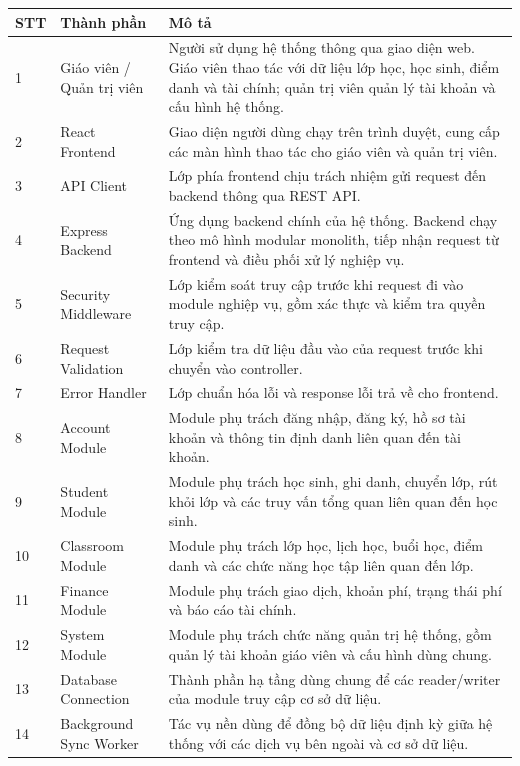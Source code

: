 \documentclass[12pt,a4paper]{article}
\begin{document}
\begingroup
\singlespacing
\setlength{\parskip}{0pt}
\renewcommand{\arraystretch}{1.25}
\footnotesize
\begin{longtable}{|p{1.2cm}|p{4.2cm}|p{9.0cm}|}
\hline
\textbf{STT} & \textbf{Thành phần} & \textbf{Mô tả} \\
\hline
\endhead
1 & Giáo viên / Quản trị viên & Người sử dụng hệ thống thông qua giao diện web. Giáo viên thao tác với dữ liệu lớp học, học sinh, điểm danh và tài chính; quản trị viên quản lý tài khoản và cấu hình hệ thống. \\
\hline
2 & React Frontend & Giao diện người dùng chạy trên trình duyệt, cung cấp các màn hình thao tác cho giáo viên và quản trị viên. \\
\hline
3 & API Client & Lớp phía frontend chịu trách nhiệm gửi request đến backend thông qua REST API. \\
\hline
4 & Express Backend & Ứng dụng backend chính của hệ thống. Backend chạy theo mô hình modular monolith, tiếp nhận request từ frontend và điều phối xử lý nghiệp vụ. \\
\hline
5 & Security Middleware & Lớp kiểm soát truy cập trước khi request đi vào module nghiệp vụ, gồm xác thực và kiểm tra quyền truy cập. \\
\hline
6 & Request Validation & Lớp kiểm tra dữ liệu đầu vào của request trước khi chuyển vào controller. \\
\hline
7 & Error Handler & Lớp chuẩn hóa lỗi và response lỗi trả về cho frontend. \\
\hline
8 & Account Module & Module phụ trách đăng nhập, đăng ký, hồ sơ tài khoản và thông tin định danh liên quan đến tài khoản. \\
\hline
9 & Student Module & Module phụ trách học sinh, ghi danh, chuyển lớp, rút khỏi lớp và các truy vấn tổng quan liên quan đến học sinh. \\
\hline
10 & Classroom Module & Module phụ trách lớp học, lịch học, buổi học, điểm danh và các chức năng học tập liên quan đến lớp. \\
\hline
11 & Finance Module & Module phụ trách giao dịch, khoản phí, trạng thái phí và báo cáo tài chính. \\
\hline
12 & System Module & Module phụ trách chức năng quản trị hệ thống, gồm quản lý tài khoản giáo viên và cấu hình dùng chung. \\
\hline
13 & Database Connection & Thành phần hạ tầng dùng chung để các reader/writer của module truy cập cơ sở dữ liệu. \\
\hline
14 & Background Sync Worker & Tác vụ nền dùng để đồng bộ dữ liệu định kỳ giữa hệ thống với các dịch vụ bên ngoài và cơ sở dữ liệu. \\

\end{longtable}
\end{document}
